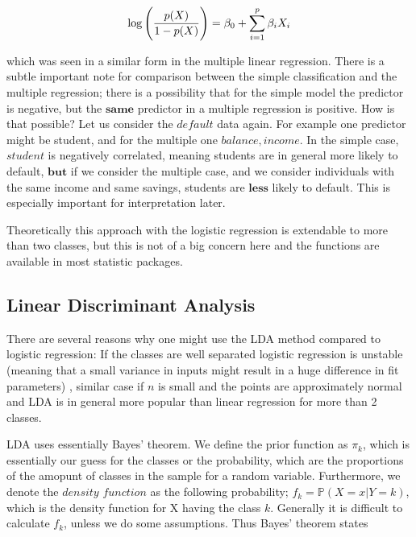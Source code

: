 \documentclass{article}
\begin{document}
\begin{equation}
    \log \Bigg{(} \frac{p(X)}{1-p(X)} \Bigg{)} = \beta_0 + \sum_{i=1}^{p}\beta_{i}X_{i}
\end{equation}

which was seen in a similar form in the multiple linear regression. 
There is a subtle important note for comparison between the simple classification and the multiple regression; there is a possibility that for the simple model the predictor is negative, but the $\mathbf{same}$ predictor in a multiple regression is positive. How is that possible? Let us consider the $default$ data again. For example one predictor might be student, and for the multiple one $balance, income$. In the simple case, $student$ is negatively correlated, meaning students are in general more likely to default, $\mathbf{but}$ if we consider the multiple case, and we consider individuals with the same income and same savings, students are $\mathbf{less}$ likely to default. This is especially important for interpretation later. \par

Theoretically this approach with the logistic regression is extendable to more than two classes, but this is not of a big concern here and the functions are available in most statistic packages. 

\subsection{Linear Discriminant Analysis}

There are several reasons why one might use the LDA method compared to logistic regression: 
If the classes are well separated logistic regression is unstable (meaning that a small variance in inputs might result in a huge difference in fit parameters) , similar case if $n$ is small and the points are approximately normal and LDA is in general more popular than linear regression for more than 2 classes.\par

LDA uses essentially Bayes' theorem. We define the prior function as $\pi_{k}$, which is essentially our guess for the classes or the probability, which are the proportions of the amopunt of classes in the sample for a random variable. Furthermore, we denote the $\textit{density function}$ as the following probability; $f_k=\mathbb{P}(X=x|Y=k)$, which is the density function for X having the class $k$. Generally it is difficult to calculate $f_{k}$, unless we do some assumptions. Thus Bayes' theorem states 
\end{document}
